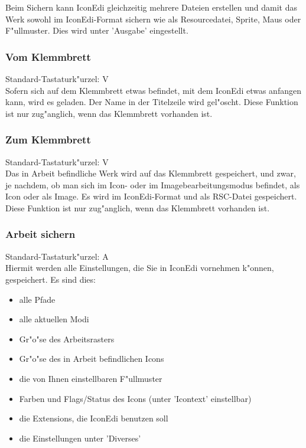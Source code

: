 Beim Sichern kann IconEdi gleichzeitig mehrere Dateien erstellen 
und damit das Werk sowohl im IconEdi-Format sichern wie als 
Resourcedatei, Sprite, Maus oder F"ullmuster. Dies wird unter 
'Ausgabe' eingestellt.

\subsubsection{Vom Klemmbrett}
Standard-Tastaturk"urzel: {\alternate}V \\ 
Sofern sich auf dem Klemmbrett etwas befindet, mit dem IconEdi
etwas anfangen kann, wird es geladen. Der Name in der Titelzeile
wird gel"oscht. Diese Funktion ist nur zug"anglich, wenn das 
Klemmbrett vorhanden ist.

\subsubsection{Zum Klemmbrett}
Standard-Tastaturk"urzel: {\alternate}V \\ 
Das in Arbeit befindliche Werk wird auf das Klemmbrett gespeichert,
und zwar, je nachdem, ob man sich im Icon- oder im 
Imagebearbeitungsmodus befindet, als Icon oder als Image. Es wird
im IconEdi-Format und als RSC-Datei gespeichert. Diese Funktion 
ist nur zug"anglich, wenn das Klemmbrett vorhanden ist.

\subsubsection{Arbeit sichern}
Standard-Tastaturk"urzel: {\control}A \\  
Hiermit werden alle Einstellungen, die Sie in IconEdi vornehmen
k"onnen, gespeichert. Es sind dies:
\begin{itemize}
 \item alle Pfade
 \item alle aktuellen Modi
 \item Gr"o"se des Arbeitsrasters
 \item Gr"o"se des in Arbeit befindlichen Icons
 \item die von Ihnen einstellbaren F"ullmuster
 \item Farben und Flags/Status des Icons (unter 'Icontext' 
  einstellbar)
 \item die Extensions, die IconEdi benutzen soll
 \item die Einstellungen unter 'Diverses'
\end{itemize}

